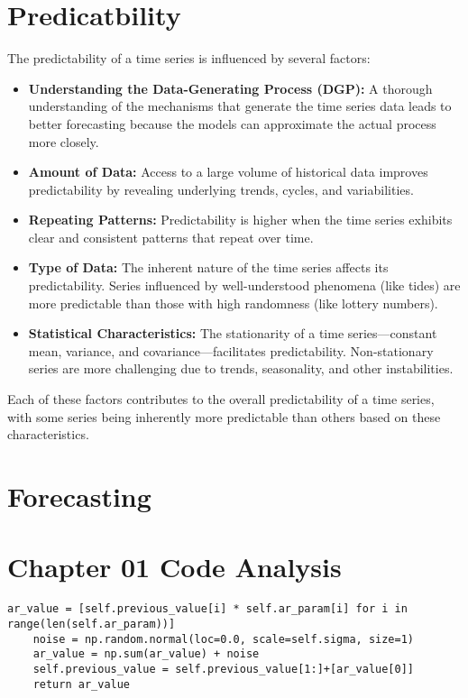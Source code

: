\documentclass{article}
\begin{document}
\section{Predicatbility}
The predictability of a time series is influenced by several factors:

\begin{itemize}
  \item \textbf{Understanding the Data-Generating Process (DGP):} A thorough understanding of the mechanisms that generate the time series data leads to better forecasting because the models can approximate the actual process more closely.
  \item \textbf{Amount of Data:} Access to a large volume of historical data improves predictability by revealing underlying trends, cycles, and variabilities.
  \item \textbf{Repeating Patterns:} Predictability is higher when the time series exhibits clear and consistent patterns that repeat over time.
  \item \textbf{Type of Data:} The inherent nature of the time series affects its predictability. Series influenced by well-understood phenomena (like tides) are more predictable than those with high randomness (like lottery numbers).
  \item \textbf{Statistical Characteristics:} The stationarity of a time series—constant mean, variance, and covariance—facilitates predictability. Non-stationary series are more challenging due to trends, seasonality, and other instabilities.
\end{itemize}

Each of these factors contributes to the overall predictability of a time series, with some series being inherently more predictable than others based on these characteristics.

\section{Forecasting}

\section{Chapter 01 Code Analysis}

\lstset{language=Python}
\begin{lstlisting}[frame=single]
    ar_value = [self.previous_value[i] * self.ar_param[i] for i in range(len(self.ar_param))]
    noise = np.random.normal(loc=0.0, scale=self.sigma, size=1)
    ar_value = np.sum(ar_value) + noise
    self.previous_value = self.previous_value[1:]+[ar_value[0]]
    return ar_value
\end{lstlisting}
\end{document}
